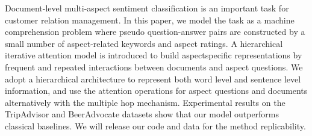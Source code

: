 Document-level multi-aspect sentiment classification is an important task for customer relation management. In this paper, we model the task as a machine comprehension problem where pseudo question-answer pairs are constructed by a small number of aspect-related keywords and aspect ratings. A hierarchical iterative attention model is introduced to build aspectspecific representations by frequent and repeated interactions between documents and aspect questions. We adopt a hierarchical architecture to represent both word level and sentence level information, and use the attention operations for aspect questions and documents alternatively with the multiple hop mechanism. Experimental results on the TripAdvisor and BeerAdvocate datasets show that our model outperforms classical baselines. We will release our code and data for the method replicability.
